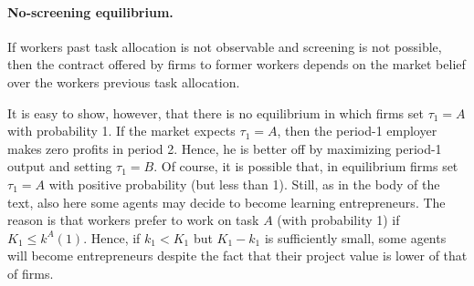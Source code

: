 \documentclass[12pt,american]{paper}
\theoremstyle{remark}
\begin{document}


\paragraph*{No-screening equilibrium.}

If workers past task allocation is not observable and screening is not possible, then the contract offered by firms to former workers depends on the market belief over the workers previous task allocation.

It is easy to show, however, that  there is no equilibrium in which firms set $\tau_1=A$ with probability 1. If the market expects $\tau_1=A$, then the period-1 employer  makes zero profits in period 2. Hence, he is better off by maximizing period-1 output and setting  $\tau_1=B$. Of course, it is possible that, in equilibrium firms set $\tau_1=A$ with positive probability (but less than 1). Still, as in the body of the text, also here some agents may decide to become learning entrepreneurs. The reason is that  workers prefer to work on task $A$ (with probability 1) if $K_1 \leq k^A(1)$. Hence,  if $k_1<K_1$ but $K_1-k_1$ is sufficiently small, some agents will become entrepreneurs despite the fact that their project value is lower of that of firms.
\end{document}
